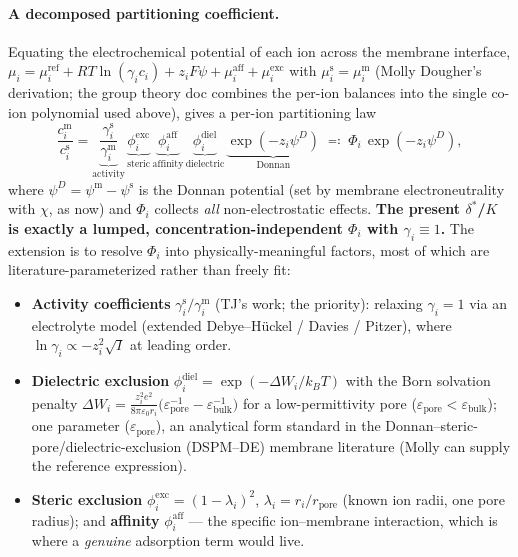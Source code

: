 \documentclass[11pt]{article}
\newcommand{\cm}[1]{{c^{\mathrm{m}}_{#1}}}
\newcommand{\cs}[1]{{c^{\mathrm{s}}_{#1}}}
\newcommand{\dstar}{\delta^{*}}
\begin{document}
\paragraph{A decomposed partitioning coefficient.} Equating the electrochemical
potential of each ion across the membrane interface,
$\mu_i=\mu_i^{\text{ref}}+RT\ln(\gamma_i c_i)+z_iF\psi+\mu_i^{\text{aff}}+\mu_i^{\text{exc}}$
with $\mu_i^{\mathrm s}=\mu_i^{\mathrm m}$ (Molly Dougher's derivation; the group
theory doc \cite{multicompDonnanTheory} combines the per-ion balances into the
single co-ion polynomial used above), gives a per-ion partitioning law
\begin{equation}
  \frac{\cm{i}}{\cs{i}}
  = \underbrace{\frac{\gamma_i^{\mathrm s}}{\gamma_i^{\mathrm m}}}_{\text{activity}}\,
    \underbrace{\phi_i^{\text{exc}}}_{\text{steric}}\,
    \underbrace{\phi_i^{\text{aff}}}_{\text{affinity}}\,
    \underbrace{\phi_i^{\text{diel}}}_{\text{dielectric}}\,
    \underbrace{\exp(-z_i\psi^{D})}_{\text{Donnan}}
  \;\eqqcolon\; \Phi_i\,\exp(-z_i\psi^{D}),
  \label{eq:partition}
\end{equation}
where $\psi^{D}=\psi^{\mathrm m}-\psi^{\mathrm s}$ is the Donnan potential (set by
membrane electroneutrality with $\chi$, as now) and $\Phi_i$ collects \emph{all}
non-electrostatic effects. \textbf{The present $\dstar$/$K$ is exactly a lumped,
concentration-independent $\Phi_i$ with $\gamma_i\equiv1$.} The extension is to
resolve $\Phi_i$ into physically-meaningful factors, most of which are
literature-parameterized rather than freely fit:
\begin{itemize}[itemsep=1pt]
  \item \textbf{Activity coefficients} $\gamma_i^{\mathrm s}/\gamma_i^{\mathrm m}$
        (TJ's work; the priority): relaxing $\gamma_i=1$ via an electrolyte model
        (extended Debye--H\"uckel / Davies / Pitzer), where $\ln\gamma_i\propto
        -z_i^2\sqrt{I}$ at leading order.
  \item \textbf{Dielectric exclusion} $\phi_i^{\text{diel}}=\exp(-\Delta W_i/k_BT)$
        with the Born solvation penalty $\Delta W_i=\frac{z_i^2 e^2}{8\pi\varepsilon_0 r_i}
        \big(\varepsilon_{\text{pore}}^{-1}-\varepsilon_{\text{bulk}}^{-1}\big)$ for
        a low-permittivity pore ($\varepsilon_{\text{pore}}<\varepsilon_{\text{bulk}}$);
        one parameter ($\varepsilon_{\text{pore}}$), an analytical form standard in
        the Donnan--steric-pore/dielectric-exclusion (DSPM--DE) membrane literature
        (Molly can supply the reference expression).
  \item \textbf{Steric exclusion} $\phi_i^{\text{exc}}=(1-\lambda_i)^2$,
        $\lambda_i=r_i/r_{\text{pore}}$ (known ion radii, one pore radius); and
        \textbf{affinity} $\phi_i^{\text{aff}}$ --- the specific ion--membrane
        interaction, which is where a \emph{genuine} adsorption term would live.
\end{itemize}
\end{document}
